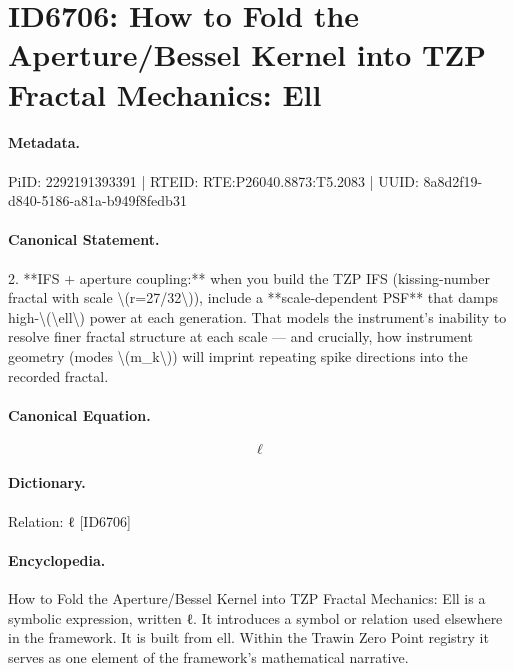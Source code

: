 \section*{ID6706: How to Fold the Aperture/Bessel Kernel into TZP Fractal Mechanics: Ell}
\paragraph{Metadata.}
PiID: 2292191393391 | RTEID: RTE:P26040.8873:T5.2083 | UUID: 8a8d2f19-d840-5186-a81a-b949f8fedb31

\paragraph{Canonical Statement.}
2. **IFS + aperture coupling:** when you build the TZP IFS (kissing-number fractal with scale \textbackslash{}(r=27/32\textbackslash{})), include a **scale-dependent PSF** that damps high-\textbackslash{}(\textbackslash{}ell\textbackslash{}) power at each generation. That models the instrument’s inability to resolve finer fractal structure at each scale — and crucially, how instrument geometry (modes \textbackslash{}(m\_k\textbackslash{})) will imprint repeating spike directions into the recorded fractal.

\paragraph{Canonical Equation.}
\[
\ell
\]

\paragraph{Dictionary.}
Relation: ℓ [ID6706]

\paragraph{Encyclopedia.}
How to Fold the Aperture/Bessel Kernel into TZP Fractal Mechanics: Ell is a symbolic expression, written ℓ. It introduces a symbol or relation used elsewhere in the framework. It is built from ell. Within the Trawin Zero Point registry it serves as one element of the framework's mathematical narrative.
